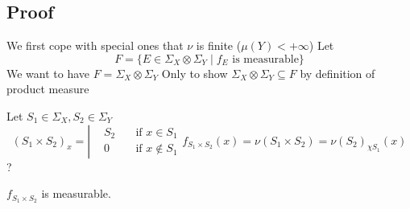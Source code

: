 \documentclass{book}
\begin{document}
\subsection*{Proof}
We first cope with special ones that $\nu$ is finite ($\mu(Y)<+\infty$)
Let $$F=\{E\in\Sigma_X\otimes\Sigma_Y\mid f_E\text{ is measurable}\}$$
We want to have $F=\Sigma_X\otimes\Sigma_Y$ Only to show $\Sigma_X\otimes\Sigma_Y\subseteq F$ by definition of product measure

Let $S_1\in\Sigma_X,S_2\in \Sigma_Y$
$$(S_1\times S_2)_x=\left|\begin{aligned}
    &S_2\quad &\text{if }x\in S_1\\
    &0\quad &\text{if }x\not\in S_1
\end{aligned}\right.
f_{S_1\times S_2}(x)=\nu(S_1\times S_2)=\nu(S_2)_{\chi S_1}(x)$$
?

$f_{S_1\times S_2}$ is measurable.
\end{document}
